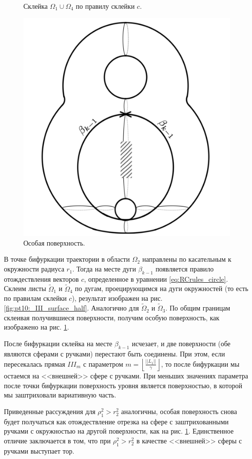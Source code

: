 \begin{figure}[!htb]
    \caption{Склейка $\Omega_1 \cup \Omega_4$ по правилу склейки $c$.}
    \label{fig:pt10:_III_surface_half}
\endminipage\hfill
{}
\centering
\includegraphics[scale=0.12]{images/section3_circular/atoms/III/surface.pdf}
    \caption{Особая поверхность.}
        \label{fig:pt10:_III_surface}
\endminipage\hfill
\end{figure}

В точке бифуркации траектории в области $\Omega_2$ направлены по касательным к окружности радиуса $r_1$. Тогда на месте дуги $\beta_{k-1}$ появляется правило отождествления векторов  $c$, определенное в уравнении \eqref{eq:RCrules_circle}. Склеим листы $\widetilde{\Omega}_1$ и $\widetilde{\Omega}_4$ по дугам, проецирующимся на дуги окружностей (то есть по правилам склейки $c$), результат изображен на рис. \ref{fig:pt10:_III_surface_half}. Аналогично для $\widetilde{\Omega}_2$ и $\widetilde{\Omega}_3$. По общим границам склеивая получившиеся поверхности, получим особую поверхность, как изображено на рис. \ref{fig:pt10:_III_surface}. 

После бифуркации склейка на месте $\beta_{k-1}$ исчезает, и две поверхности (обе являются сферами с ручками) перестают быть соединены. При этом, если пересекалась прямая $III_m$ с параметром $m=\left\lfloor \frac{||L_1||}{\gamma} \right\rfloor$, то после бифуркации мы остаемся на <<внешней>> сфере с ручками. При меньших значениях параметра после точки бифуркации поверхность уровня является поверхностью, в которой мы заштриховали вариативную часть.
 \begin{remark}
 Приведенные рассуждения для $\rho_1^2 > r_2^2$ аналогичны, особая поверхность снова будет получаться как отождествление отрезка на сфере с заштрихованными ручками с окружностью на другой поверхности, как на рис. \ref{fig:pt10:_III_surface}. Единственное отличие заключается в том, что при $\rho_1^2 > r_2^2$ в качестве <<внешней>> сферы с ручками выступает тор.
 \end{remark}
 
